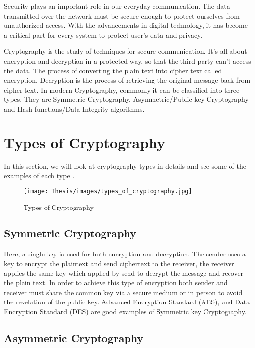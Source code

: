 \documentclass{cpp}
\begin{document}
Security plays an important role in our everyday communication. The data transmitted over the network must be secure enough to protect ourselves from unauthorized access. With the advancements in digital technology, it has become a critical part for every system to protect user’s data and privacy. 

Cryptography is the study of techniques for secure communication. It’s all about encryption and decryption in a protected way, so that the third party can’t access the data. The process of converting the plain text into cipher text called encryption. Decryption is the process of retrieving the original message back from cipher text. In modern Cryptography, commonly it can be classified into three types. They are Symmetric Cryptography, Asymmetric/Public key Cryptography and Hash functions/Data Integrity algorithms. 

\section{Types of Cryptography}

In this section, we will look at cryptography types in details and see some of the examples of each type \cite{gary}. 

\begin{figure*}[htp]
    \centering
    \texttt{[image: Thesis/images/types\_of\_cryptography.jpg]}
    \caption{Types of Cryptography}
    \label{fig:figure21}
\end{figure*}


\newpage
\subsection{Symmetric Cryptography}

Here, a single key is used for both encryption and decryption. The sender uses a key to encrypt the plaintext and send ciphertext to the receiver, the receiver applies the same key which applied by send to decrypt the message and recover the plain text. In order to achieve this type of encryption both sender and receiver must share the common key via a secure medium or in person to avoid the revelation of the public key. Advanced Encryption Standard (AES), and Data Encryption Standard (DES) are good examples of Symmetric key Cryptography.

\subsection{Asymmetric Cryptography}
\end{document}
